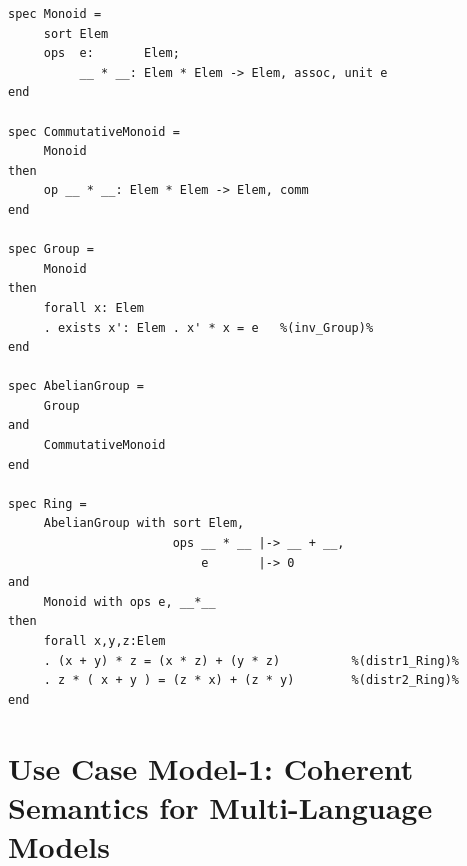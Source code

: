 \documentclass[10pt,fleqn,%
\ifpretendfinal
final%
\else
draft%
\fi,
]{scrreprt}
\begin{document}
\begin{lstlisting}[basicstyle=\ttfamily\footnotesize,language=dolText,morekeywords={spec,props,ObjectProperty,Class,DisjointUnionOf,SubClassOf,Characteristics,Transitive,Asymmetric,SubPropertyOf,DisjointClasses,EquivalentTo,inverse,only,forall,iff,if,or,exists,distributed,from},escapechar=@,mathescape]	
spec Monoid =
     sort Elem
     ops  e:       Elem;
          __ * __: Elem * Elem -> Elem, assoc, unit e
end

spec CommutativeMonoid =
     Monoid
then
     op __ * __: Elem * Elem -> Elem, comm
end

spec Group =
     Monoid
then
     forall x: Elem
     . exists x': Elem . x' * x = e   %(inv_Group)%
end

spec AbelianGroup =
     Group
and
     CommutativeMonoid
end

spec Ring =
     AbelianGroup with sort Elem,
                       ops __ * __ |-> __ + __,
                           e       |-> 0
and
     Monoid with ops e, __*__
then
     forall x,y,z:Elem
     . (x + y) * z = (x * z) + (y * z)          %(distr1_Ring)%
     . z * ( x + y ) = (z * x) + (z * y)        %(distr2_Ring)%
end
\end{lstlisting}

\section{Use Case Model-1: Coherent Semantics for Multi-Language Models}
	
\end{document}
